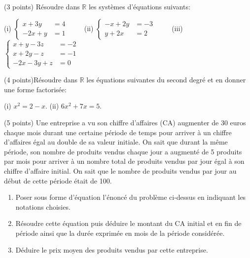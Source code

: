 \documentclass[a4paper, 11pt]{article}
\begin{document}
\exost (3 points) R\'esoudre dans $\mathbb{R}$ les syst\`emes d'\'equations suivants:
  \begin{center}
   (i) $\begin{cases}x+ 3y &= 4\\
              -2x+ y &= 1 \end{cases}\quad\quad$%
   (ii) $\begin{cases}      -x + 2y &= -3 \\
                             y + 2x &= 2\end{cases}\quad\quad$%
   (iii) $ \begin{cases}    x  + y- 3z&= -2 \\
                            x  + 2y- z&= -1 \\
                           -2x - 3y+ z&= 0\end{cases}$
  \end{center} %

  \exost (4 points)R\'esoudre dans $\mathbb{R}$ les \'equations suivantes du second degr\'e et en donner une forme factoris\'ee:
  \begin{center}
    (i) $x^2 = 2 -x$. \quad\quad (ii) $6x^2+ 7x= 5$. %
  \end{center}
  
  
  \exost (5 points) Une entreprise a vu son chiffre d'affaires (CA) augmenter de 30 euros chaque mois durant une certaine p\'eriode de temps %
  pour arriver \`a un chiffre d'affaires \'egal au double de sa valeur initiale. On sait que durant la m\^eme p\'eriode, son nombre
  de produits vendus chaque jour a augment\'e de 5 produits par mois pour arriver \`a un nombre total de produits vendus par jour \'egal \`a son chiffre d'affaire initial.
  On sait que le nombre de produits vendus par jour au d\'ebut de cette p\'eriode \'etait de 100.
  
  \begin{enumerate}
   \item Poser sous forme d'\'equation l'\'enonc\'e du probl\`eme ci-dessus en indiquant les notations choisies.
   \item R\'esoudre cette \'equation puis d\'eduire le montant du CA initial et en fin de p\'eriode ainsi que la dur\'ee exprim\'ee en mois de la p\'eriode consid\'er\'ee.
   \item D\'eduire le prix moyen des produits vendus par cette entreprise.
  \end{enumerate}

  
\end{document}
